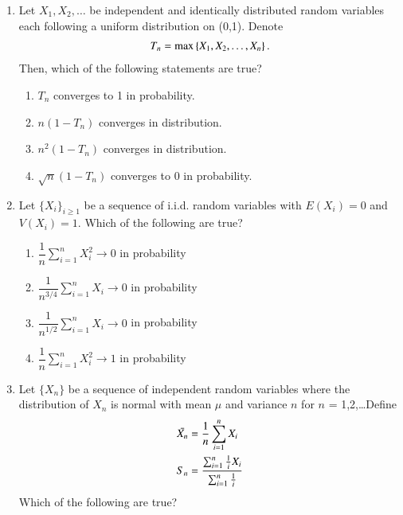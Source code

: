 \renewcommand{\theequation}{\theenumi}
\renewcommand{\thefigure}{\theenumi}
\renewcommand{\thetable}{\theenumi}
\begin{enumerate}[label=\thesection.\arabic*.,ref=\thesection.\theenumi]
%
\item 
Let $X_{1},X_{2},\dots$ be independent and identically distributed random variables each following a uniform distribution on (0,1). Denote 
\begin{align}
T_{n}=\max\left\{ X_{1},X_{2},\dots,X_{n}\right\}. 
\end{align}
Then, which of the following statements are true?
\begin{enumerate}
    \item $T_{n}$ converges to 1 in probability.
    \item $n(1-T_{n})$ converges in distribution.
    \item $n^{2}(1-T_{n})$ converges in distribution.
    \item $\sqrt{n}(1-T_{n})$ converges to 0 in probability.
\end{enumerate}
%
\solution

%
\item Let $\{X_i\}_{i \geq 1}$ be a sequence of i.i.d. random variables with $E(X_i)=0$ and $V(X_i)=1$. Which of the following are true?
%
\begin{enumerate}
    \setlength{\itemsep}{2pt}
    \item $\dfrac{1}{n} \sum_{i=1}^n X_i^2 \to 0$ in probability 
    \item $\dfrac{1}{n^{3/4}} \sum_{i=1}^n X_i \to 0$ in probability 
    \item $\dfrac{1}{n^{1/2}} \sum_{i=1}^n X_i \to 0$ in probability 
    \item $\dfrac{1}{n} \sum_{i=1}^n X_i^2 \to 1$ in probability
\end{enumerate}
%
\solution

%
\item Let $\{X_{n}\}$ be a sequence of independent random variables where the distribution of $X_{n}$ is normal with mean $\mu$ and variance $n$ for $n$ = 1,2,\dots Define
\begin{align}
    \Bar{X_{n}}&=\frac{1}{n}\sum_{i=1}^{n}X_{i}\\ S_{n}&=\frac{\sum_{i=1}^{n}\frac{1}{i}X_{i}}{\sum_{i=1}^{n}\frac{1}{i}}
\end{align}
Which of the following are true?
\begin{enumerate}

\end{enumerate}
\end{enumerate}
